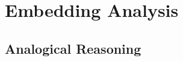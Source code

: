 \section{Embedding Analysis} \label{sec:analysis}


\subsection{Analogical Reasoning} \label{sec:analysis_analogy}


    
    


